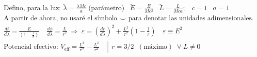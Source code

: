\begin{align*}
    &\text{Defino, para la luz: } \breve{\lambda}=\frac{\lambda M c}{a}\; \text{(parámetro)}\; \; \;
    \breve{E}=\frac{E}{Mc^2}\; \; \; \breve{L}=\frac{L}{Mca};\; \; \; c=1\; \; \; a=1\\
    &\text{A partir de ahora, no usaré el símbolo $\smallsmile$  para denotar las unidades adimensionales.}\\
    &\frac{dt}{d\lambda}= \frac{E}{\left(1-\frac{1}{r}\right)}\; \; \; \; \frac{d\phi}{d\lambda}=\frac{L}{r^2}\;\Rightarrow \;\varepsilon=\left(\frac{dr}{d\lambda} \right)^2 + \frac{L^2}{r^2}\left(1-\frac{1}{r}\right)\; \; \; \, 
    \varepsilon\equiv E^2\\
    &\text{Potencial efectivo: }V_{\text{eff}}=\frac{L^2}{r^2}-\frac{L^2}{r^3}\; \; \; \; 
\left|
\begin{array}{l}
 r=3/2 \;  \; (\text{máximo}) \; \;\forall\;  L\neq 0
 \end{array}
\right.
\end{align*}
